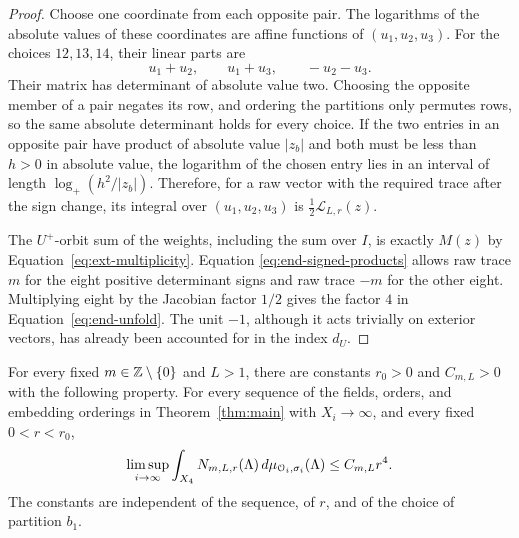 \begin{proof}
Choose one coordinate from each opposite pair.  The logarithms of the
absolute values of these coordinates are affine functions of
$(u_1,u_2,u_3)$.  For the choices $12,13,14$, their linear parts are
\[
 u_1+u_2,\qquad u_1+u_3,\qquad -u_2-u_3.
\]
Their matrix has determinant of absolute value two.  Choosing the
opposite member of a pair negates its row, and ordering the partitions
only permutes rows, so the same absolute determinant holds for every
choice.  If the two entries in an opposite pair have product of absolute
value $|z_b|$ and both must be less than $h>0$ in absolute value, the
logarithm of the chosen entry lies in an interval of length
$\log_+(h^2/|z_b|)$.  Therefore, for a raw vector with the required
trace after the sign change, its integral over $(u_1,u_2,u_3)$ is
$\frac12\mathcal L_{L,r}(z)$.

The $U^+$-orbit sum of the weights, including the sum over $I$, is exactly
$M(z)$ by Equation~\eqref{eq:ext-multiplicity}.  Equation
\eqref{eq:end-signed-products} allows raw trace $m$ for the eight positive
determinant signs and raw trace $-m$ for the other eight.  Multiplying
eight by the Jacobian factor $1/2$ gives the factor $4$ in
Equation~\eqref{eq:end-unfold}.  The unit $-1$, although it acts trivially
on exterior vectors, has already been accounted for in the index $d_U$.
\end{proof}

\begin{proposition}\label{prop:end-tube}
For every fixed $m\in\mathbb Z\setminus\{0\}$ and $L>1$, there are constants
$r_0>0$ and $C_{m,L}>0$ with the following property.  For every sequence
of the fields, orders, and embedding orderings in Theorem~\ref{thm:main}
with $X_i\to\infty$, and every fixed $0<r<r_0$,
\begin{equation}\label{eq:end-tube}
 \limsup_{i\to\infty}
   \int_{X_4}N_{m,L,r}(\Lambda)\,
           d\mu_{\mathcal O_i,\sigma_i}(\Lambda)
       \le C_{m,L}r^4.
\end{equation}
The constants are independent of the sequence, of $r$, and of the choice
of partition $b_1$.
\end{proposition}

